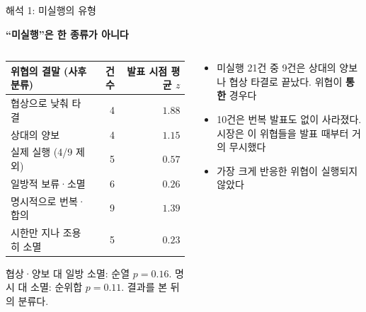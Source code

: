 \documentclass[aspectratio=169,9pt,t]{beamer}
\newcommand{\msg}[1]{{\fontsize{11.5}{15}\selectfont\bfseries\color{navy}\RaggedRight #1\par}\vspace{2.0mm}}
\newcommand{\tf}{\fontsize{8.2}{10.4}\selectfont}
\begin{document}
\begin{frame}{해석 1: 미실행의 유형}
\msg{``미실행''은 한 종류가 아니다}
\begin{columns}[c,onlytextwidth]
\begin{column}{0.54\textwidth}
\begingroup\tf
\begin{tabularx}{\linewidth}{@{}Yrr@{}}
\toprule
위협의 결말 (사후 분류) & 건수 & 발표 시점 평균 $z$\\
\midrule
협상으로 낮춰 타결 & 4 & $1.88$\\
상대의 양보 & 4 & $1.15$\\
실제 실행 (4/9 제외) & 5 & $0.57$\\
일방적 보류·소멸 & 6 & $0.26$\\
\midrule
명시적으로 번복·합의 & 9 & $1.39$\\
시한만 지나 조용히 소멸 & 5 & $0.23$\\
\bottomrule
\end{tabularx}\endgroup
\vspace{1.5mm}
{\small\RaggedRight 협상·양보 대 일방 소멸: 순열 $p=0.16$. 명시 대 소멸: 순위합 $p=0.11$. 결과를 본 뒤의 분류다.\par}
\end{column}
\begin{column}{0.42\textwidth}
\begin{itemize}
\item 미실행 21건 중 9건은 상대의 양보나 협상 타결로 끝났다. 위협이 \textbf{통한} 경우다
\item 10건은 번복 발표도 없이 사라졌다. 시장은 이 위협들을 발표 때부터 거의 무시했다
\item 가장 크게 반응한 위협이 실행되지 않았다
\end{itemize}
\end{column}
\end{columns}
\end{frame}
\end{document}
